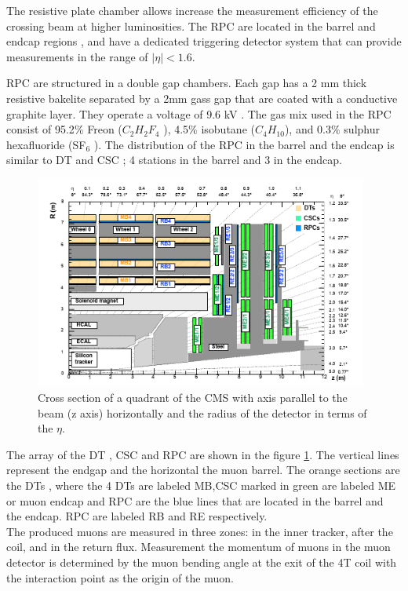 \begin{linenumbers}
The resistive plate chamber allows increase the measurement efficiency of the crossing beam at higher luminosities. The RPC are located in the barrel and endcap regions , and have a dedicated triggering detector system that can provide measurements in the range of $|\eta|<1.6$.\\
\pagebreak

RPC are structured in a double gap chambers.
Each gap has a 2 mm thick resistive bakelite separated by a 2mm gass gap that are coated with a conductive graphite layer. They operate a voltage of 9.6 kV . The gas mix used in the RPC consist of 95.2$\%$ Freon
($C_2 H_2 F_4$ ), 4.5$\%$ isobutane ($C_4 H_{10}$), and 0.3$\%$ sulphur hexafluoride (SF$_6$ ). The distribution of the RPC in the barrel and the endcap is similar to DT and CSC ; 4 stations in the barrel and 3 in the endcap.\cite{cms7}


\begin{figure}[!htbp]
	\centering
	\includegraphics[width=11cm,height=7cm]{Chapter2/csc}
	\caption{Cross section of a quadrant of the CMS with axis parallel to the beam (z axis) horizontally and the radius of the detector in terms of the $\eta$.}
	\label{dt}
\end{figure}

The array of the DT , CSC and RPC are shown in the figure \ref{dt}. The vertical lines represent the endgap and the horizontal the muon barrel. The orange sections are the DTs , where the 4 DTs are labeled MB,CSC marked in green are labeled ME or muon endcap and RPC are the blue lines that are located in the barrel and the endcap. RPC are labeled RB and RE respectively. 
\\

The produced muons are measured in three zones: in the inner tracker, after the coil, and in
the return flux. Measurement the momentum of muons in the muon detector is determined by the muon bending angle at the exit of the 4T coil with the interaction point as the origin of the muon.\cite{cms7}\cite{cms-manual}





\end{linenumbers}
